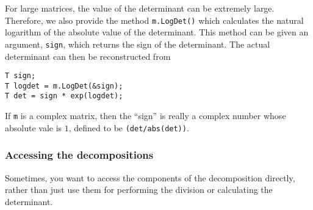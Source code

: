 \documentclass[twoside,letterpaper,11pt]{article}
\renewcommand{\tt}[1]{{\texttt {#1}}}
\begin{document}
For large matrices, the value of the determinant can be extremely large.  Therefore, we
also provide the method \tt{m.LogDet()} which calculates the natural logarithm of the
absolute value of the determinant.  This method can be given an argument, \tt{sign},
which returns the sign of the determinant.  The actual determinant can then be 
reconstructed from 
\begin{verbatim}
T sign;
T logdet = m.LogDet(&sign);
T det = sign * exp(logdet);
\end{verbatim}
If \tt{m} is a complex matrix, then the ``sign'' is really a complex number whose 
absolute vale is $1$, defined to be \tt{(det/abs(det))}.

\subsubsection{Accessing the decompositions}

Sometimes, you want to access the components of the decomposition directly,
rather than just use them for performing the division or calculating the determinant.
\end{document}
